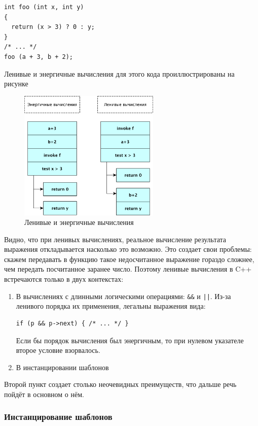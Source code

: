 \documentclass[a4paper,12pt,oneside]{article}
\begin{document}
\begin{lstlisting}
int foo (int x, int y)
{
  return (x > 3) ? 0 : y;
}
/* ... */
foo (a + 3, b + 2);
\end{lstlisting}

Ленивые и энергичные вычисления для этого кода проиллюстрированы на рисунке

\begin{figure}[h!]
\centering
\includegraphics[width=0.6\textwidth]{illustrations/lazyorder-crop.pdf}
\caption{Ленивые и энергичные вычисления}
\label{fig:lazy_calc}
\end{figure}

Видно, что при ленивых вычислениях, реальное вычисление результата выражения откладывается насколько это возможно. Это создает свои проблемы: скажем передавать в функцию такое недосчитанное выражение гораздо сложнее, чем передать посчитанное заранее число. Поэтому ленивые вычисления в C++ встречаются только в двух контекстах:

\begin{enumerate}
\item В вычислениях с длинными логическими операциями: \lstinline!&&! и \lstinline!||!. Из-за ленивого порядка их применения, легальны выражения вида:
\begin{lstlisting}
if (p && p->next) { /* ... */ }
\end{lstlisting}
Если бы порядок вычисления был энергичным, то при нулевом указателе второе условие взорвалось.
\item В инстанцировании шаблонов
\end{enumerate}

Второй пункт создает столько неочевидных преимуществ, что дальше речь пойдёт в основном о нём.

\subsubsection{Инстанцирование шаблонов}\label{Templateinstancing}
\end{document}
